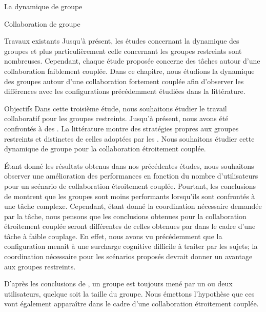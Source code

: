 \documentclass[myfrancais,ngerman,english,frenchb]{mythesis}
\begin{document}
\begin{mychapter}{La dynamique de groupe}
\begin{mysection}{Collaboration de groupe}
\begin{mysubsection}{Travaux existants}
				Jusqu'à présent, les études concernant la dynamique des groupes et plus particulièrement celle concernant les groupes restreints sont nombreuses.
				Cependant, chaque étude proposée concerne des tâches autour d'une collaboration faiblement couplée.
				Dans ce chapitre, nous étudions la dynamique des groupes autour d'une collaboration fortement couplée afin d'observer les différences avec les configurations précédemment étudiées dans la littérature.
			\end{mysubsection}
			\begin{mysubsection}{Objectifs}
				Dans cette troisième étude, nous souhaitons étudier le travail collaboratif pour les groupes restreints.
				Jusqu'à présent, nous avons été confrontés à des .
				La littérature montre des stratégies propres aux groupes restreints et distinctes de celles adoptées par les .
				Nous souhaitons étudier cette dynamique de groupe pour la collaboration étroitement couplée.

				Étant donné les résultats obtenus dans nos précédentes études, nous souhaitons observer une amélioration des performances en fonction du nombre d'utilisateurs pour un scénario de collaboration étroitement couplée.
				Pourtant, les conclusions de  montrent que les groupes sont moins performants lorsqu'ils sont confrontés à une tâche complexe.
				Cependant, étant donné la coordination nécessaire demandée par la tâche, nous pensons que les conclusions obtenues pour la collaboration étroitement couplée seront différentes de celles obtenues par  dans le cadre d'une tâche à faible couplage.
				En effet, nous avons vu précédemment que la configuration  menait à une surcharge cognitive difficile à traiter par les sujets; la coordination nécessaire pour les scénarios proposés devrait donner un avantage aux groupes restreints.

				D'après les conclusions de , un groupe est toujours mené par un ou deux utilisateurs, quelque soit la taille du groupe.
				Nous émettons l'hypothèse que ces  vont également apparaître dans le cadre d'une collaboration étroitement couplée.


\end{mysubsection}
\end{mysection}
\end{mychapter}
\end{document}
